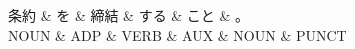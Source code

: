 \documentclass[tikz,border=5pt]{standalone}
\begin{document}
\normalsize
\begin{dependency}[edge unit distance=12.0pt]
    \begin{deptext}[column sep=1em]
        条約 \& を \& 締結 \& する \& こと \& 。\\
        NOUN \& ADP \& VERB \& AUX \& NOUN \& PUNCT\\
    \end{deptext}
\end{dependency}
\end{document}
